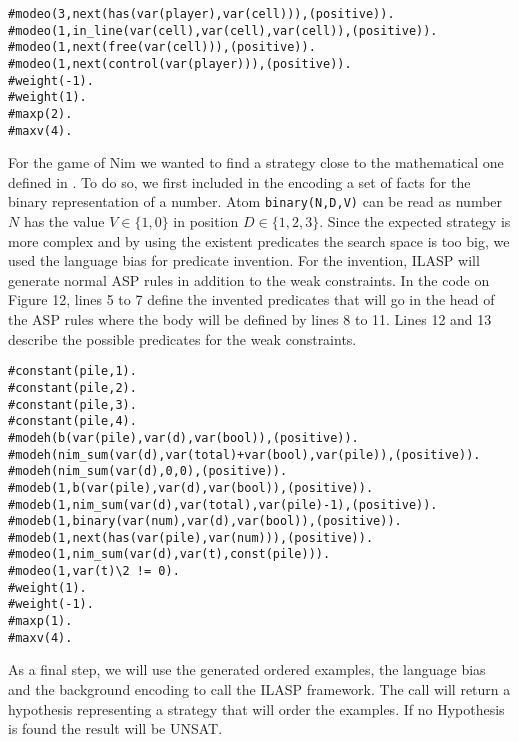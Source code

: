 \begin{center}
  \begin{lstlisting}[] 
#modeo(3,next(has(var(player),var(cell))),(positive)).
#modeo(1,in_line(var(cell),var(cell),var(cell)),(positive)).
#modeo(1,next(free(var(cell))),(positive)).
#modeo(1,next(control(var(player))),(positive)).
#weight(-1).
#weight(1).
#maxp(2).
#maxv(4).
  \end{lstlisting}
\end{center}


For the game of Nim we wanted to find a strategy close to the mathematical one defined in . To do so, we first included in the encoding a set of facts for the binary representation of a number. Atom \texttt{binary(N,D,V)} can be read as number $N$ has the value $V\in\{1,0\}$ in position $D\in\{1,2,3\}$. Since the expected strategy is more complex and by using the existent predicates the search space is too big, we used the language bias for predicate invention. For the invention, ILASP will generate normal ASP rules in addition to the weak constraints. In the code on Figure 12, lines 5 to 7 define the invented predicates that will go in the head of the ASP rules where the body will be defined by lines 8 to 11. Lines 12 and 13 describe the possible predicates for the weak constraints.


\begin{center}
  \begin{lstlisting}[] 
#constant(pile,1).
#constant(pile,2).
#constant(pile,3).
#constant(pile,4).
#modeh(b(var(pile),var(d),var(bool)),(positive)).
#modeh(nim_sum(var(d),var(total)+var(bool),var(pile)),(positive)).
#modeh(nim_sum(var(d),0,0),(positive)).
#modeb(1,b(var(pile),var(d),var(bool)),(positive)).
#modeb(1,nim_sum(var(d),var(total),var(pile)-1),(positive)).
#modeb(1,binary(var(num),var(d),var(bool)),(positive)).
#modeb(1,next(has(var(pile),var(num))),(positive)).
#modeo(1,nim_sum(var(d),var(t),const(pile))).
#modeo(1,var(t)\2 != 0).
#weight(1).
#weight(-1).
#maxp(1).
#maxv(4).
  \end{lstlisting}
\end{center}

As a final step, we will use the generated ordered examples, the language bias and the background encoding to call the ILASP framework. The call will return a hypothesis representing a strategy that will order the examples. If no Hypothesis is found the result will be UNSAT.

